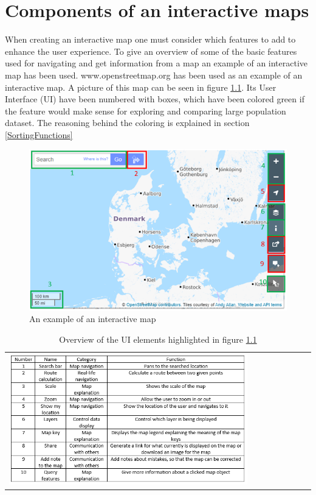\chapter{Components of an interactive maps}
When creating an interactive map one must consider which features to add to enhance the user experience. To give an overview of some of the basic features used for navigating and get information from a map an example of an interactive map has been used. www.openstreetmap.org has been used as an example of an interactive map. \citep{OpenStreetMap} A picture of this map can be seen in figure \ref{InteractiveMap}. Its User Interface (UI) have been numbered with boxes, which have been colored green if the feature would make sense for exploring and comparing large population dataset. The reasoning behind the coloring is explained in section \ref{SortingFunctions}


\begin{figure} [H]
	\centering
	\includegraphics[width=.8\textwidth]{Pictures/InteractiveMap}
	\caption{An example of an interactive map}
	\label{InteractiveMap}
\end{figure}

\begin{table}[htbp]
	\centering
	\begin{tabular}{l}
		\includegraphics[width=0.8\textwidth]{Pictures/tabOSMFunctions}
	\end{tabular}
	\caption{Overview of the UI elements highlighted in figure \ref{InteractiveMap}}
	\label{tabOSMFunctions}
\end{table}

